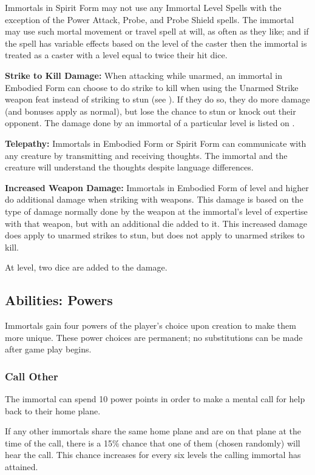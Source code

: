 \begin{multicols*}{2}
Immortals in Spirit Form may not use any Immortal Level Spells with the exception of the Power Attack, Probe, and Probe Shield spells. The immortal may use such mortal movement or travel spell at will, as often as they like; and if the spell has variable effects based on the level of the caster then the immortal is treated as a caster with a level equal to twice their hit dice.

\textbf{Strike to Kill Damage:} When attacking while unarmed, an immortal in Embodied Form can choose to do strike to kill when using the Unarmed Strike weapon feat instead of striking to stun (see ). If they do so, they do more damage (and  bonuses apply as normal), but lose the chance to stun or knock out their opponent. The damage done by an immortal of a particular level is listed on .

\textbf{Telepathy:} Immortals in Embodied Form or Spirit Form can communicate with any creature by transmitting and receiving thoughts. The immortal and the creature will understand the thoughts despite language differences.

\textbf{Increased Weapon Damage:} Immortals in Embodied Form of  level and higher do additional damage when striking with weapons. This damage is based on the type of damage normally done by the weapon at the immortal’s level of expertise with that weapon, but with an additional die added to it. This increased damage does apply to unarmed strikes to stun, but does not apply to unarmed strikes to kill.

At  level, two dice are added to the damage.

\subsection{Abilities: Powers}
Immortals gain four powers of the player’s choice upon creation to make them more unique. These power choices are permanent; no substitutions can be made after game play begins.

\subsubsection{Call Other}
The immortal can spend 10 power points in order to make a mental call for help back to their home plane.

If any other immortals share the same home plane and are on that plane at the time of the call, there is a 15\% chance that one of them (chosen randomly) will hear the call. This chance increases for every six levels the calling immortal has attained.


\end{multicols*}
